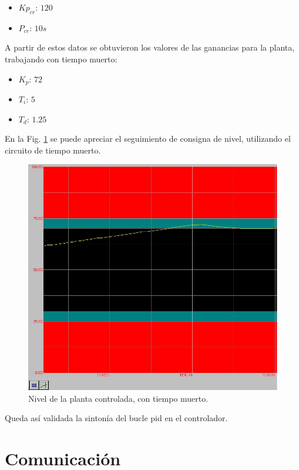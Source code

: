\begin{itemize}
 \item $Kp_{cr}$:
 $120$
 \item $P_{cr}$:
 $10 s$
\end{itemize}

A partir de estos datos se obtuvieron los valores de las ganancias
para la planta, trabajando con tiempo muerto:

\begin{itemize}
 \item $K_p $: $72$
 \item $T_i $: $5$
 \item $T_d $: $1.25$
\end{itemize}

En la Fig. \ref{fig:controladotd} se puede apreciar el seguimiento de consigna
de nivel, utilizando el circuito de tiempo muerto.

\begin{figure}[ht]
 \centering
 \includegraphics[scale=0.4]{Cap4-ProgramacionPLC/images/controladotd.png}
 \caption{Nivel de la planta controlada, con tiempo muerto.}
 \label{fig:controladotd}
\end{figure}

Queda así validada la sintonía del bucle \gls{pid} en el controlador.

\section{Comunicación}
\label{sec:Comunicacion}

